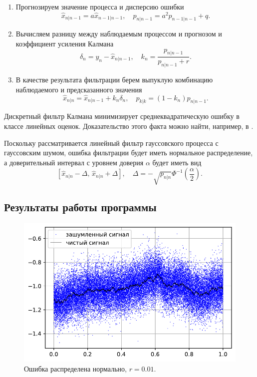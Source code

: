 \documentclass[16pt]{article}
\begin{document}
\begin{enumerate}
	\item Прогнозируем значение процесса и дисперсию ошибки
$$ \hat x_{n|n-1} = a\hat x_{n-1|n-1}, \quad p_{n|n-1} = a^2 p_{n-1|n-1} + q.$$
	\item Вычисляем разницу между наблюдаемым процессом и прогнозом и коэффициент усиления Калмана
$$ \delta_{n} = y_n - \hat x_{n|n-1}, \quad k_n = \dfrac{p_{n|n-1}}{p_{n|n-1} + r}.$$
	\item В качестве результата фильтрации берем выпуклую комбинацию наблюдаемого и предсказанного значения
$$ \hat x_{n|n} = \hat x_{n|n-1} + k_n\delta_n, \quad p_{k|k} = (1 - k_n)p_{n|n-1}. $$
\end{enumerate}

Дискретный фильтр Калмана минимизирует среднеквадратическую ошибку в классе линейных оценок. Доказательство этого факта можно найти, например, в \cite{Ostrem}.

Поскольку рассматривается линейный фильтр гауссовского процесса с гауссовским шумом, ошибка фильтрации будет иметь нормальное распределение, а доверительный интервал с уровнем доверия $\alpha$ будет иметь вид
$$[\hat x_{n|n} - \Delta, \, \hat x_{n|n} + \Delta], \quad \Delta = -\sqrt{p_{n|n}}\Phi^{-1}\left(\dfrac{\alpha}2\right).$$
\subsection{Результаты работы программы}
\begin{figure}
	\center
	\includegraphics[scale=0.7]{10_1.pdf}
	\caption{Ошибка распределена нормально, $r = 0.01$.}
\end{figure}
\end{document}
